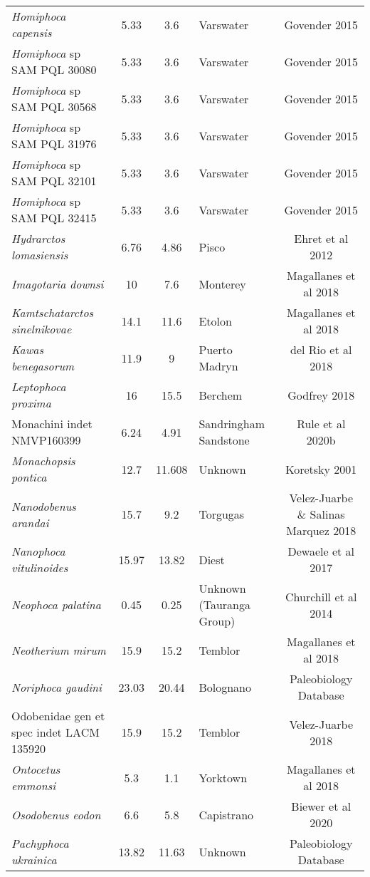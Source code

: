 \begin{longtable}{p{}cclc}
\textit{Homiphoca capensis} & 	5.33	&	3.6	&	Varswater	&	Govender 2015	\\
\textit{Homiphoca} sp SAM PQL 30080 & 	5.33	&	3.6	&	Varswater	&	Govender 2015	\\
\textit{Homiphoca} sp SAM PQL 30568 & 	5.33	&	3.6	&	Varswater	&	Govender 2015	\\
\textit{Homiphoca} sp SAM PQL 31976 & 	5.33	&	3.6	&	Varswater	&	Govender 2015	\\
\textit{Homiphoca} sp SAM PQL 32101 & 	5.33	&	3.6	&	Varswater	&	Govender 2015	\\
\textit{Homiphoca} sp SAM PQL 32415 & 	5.33	&	3.6	&	Varswater	&	Govender 2015	\\
\textit{Hydrarctos lomasiensis} & 	6.76	&	4.86	&	Pisco	&	Ehret et al 2012	\\
\textit{Imagotaria downsi} & 	10	&	7.6	&	Monterey	&	Magallanes et al 2018	\\
\textit{Kamtschatarctos sinelnikovae} & 	14.1	&	11.6	&	Etolon	&	Magallanes et al 2018	\\
\textit{Kawas benegasorum} & 	11.9	&	9	&	Puerto Madryn	&	del Rio et al 2018	\\
\textit{Leptophoca proxima} & 	16	&	15.5	&	Berchem	&	Godfrey 2018	\\
Monachini indet NMVP160399 & 	6.24	&	4.91	&	Sandringham Sandstone	&	Rule et al 2020b	\\
\textit{Monachopsis pontica} & 	12.7	&	11.608	&	Unknown	&	Koretsky 2001	\\
\textit{Nanodobenus arandai} & 	15.7	&	9.2	&	Torgugas	&	Velez-Juarbe \& Salinas Marquez 2018	\\
\textit{Nanophoca vitulinoides} & 	15.97	&	13.82	&	Diest	&	Dewaele et al 2017	\\
\textit{Neophoca palatina} & 	0.45	&	0.25	&	Unknown (Tauranga Group)	&	Churchill et al 2014	\\
\textit{Neotherium mirum} & 	15.9	&	15.2	&	Temblor	&	Magallanes et al 2018	\\
\textit{Noriphoca gaudini} & 	23.03	&	20.44	&	Bolognano	&	Paleobiology Database	\\
Odobenidae gen et spec indet LACM 135920 & 	15.9	&	15.2	&	Temblor	&	Velez-Juarbe 2018	\\
\textit{Ontocetus emmonsi} & 	5.3	&	1.1	&	Yorktown	&	Magallanes et al 2018	\\
\textit{Osodobenus eodon} & 	6.6	&	5.8	&	Capistrano	&	Biewer et al 2020	\\
\textit{Pachyphoca ukrainica} & 	13.82	&	11.63	&	Unknown	&	Paleobiology Database	\\

\end{longtable}

